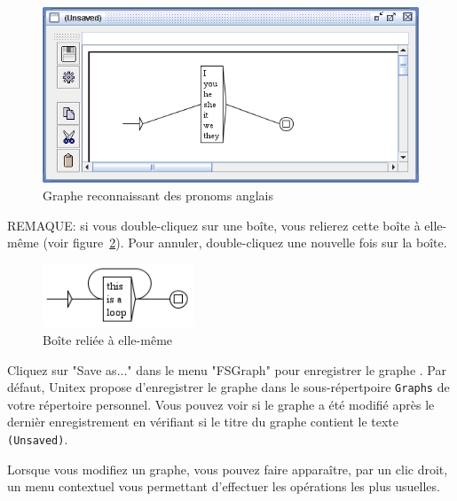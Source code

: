 \begin{figure}[!ht]
\begin{center}
\includegraphics[width=14.5cm]{resources/img/fig5-5.png}
\caption{Graphe reconnaissant des pronoms anglais\label{fig-pronoun-graph}}
\end{center}
\end{figure}

\bigskip
\noindent REMAQUE: si vous double-cliquez sur une boîte, vous relierez cette boîte à elle-même (voir
figure~\ref{fig-loop-box}). Pour annuler, double-cliquez une nouvelle fois sur la boîte.

\bigskip
\begin{figure}[!h]
\begin{center}
\includegraphics[width=4.5cm]{resources/img/fig5-6.png}
\caption{Boîte reliée à elle-même\label{fig-loop-box}}
\end{center}
\end{figure}

\noindent Cliquez sur "Save as..." dans le menu "FSGraph" pour enregistrer le graphe
. Par défaut, Unitex propose d'enregistrer le graphe dans le 
sous-répertpoire \verb+Graphs+ de votre répertoire personnel. Vous pouvez voir si le graphe a été
modifié après le dernièr enregistrement  en vérifiant si le titre du graphe contient le texte
\verb+(Unsaved)+.


\bigskip
\noindent Lorsque vous modifiez un graphe, vous pouvez faire apparaître, par un clic droit, un menu
contextuel vous permettant d'effectuer les opérations les plus usuelles.

